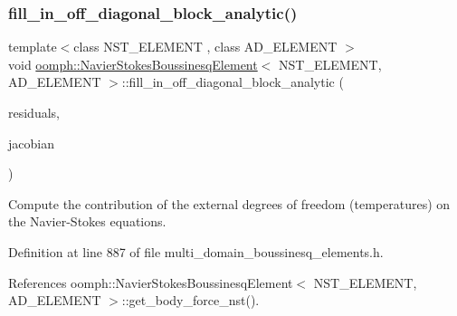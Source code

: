 \subsubsection{\texorpdfstring{fill\+\_\+in\+\_\+off\+\_\+diagonal\+\_\+block\+\_\+analytic()}{fill\_in\_off\_diagonal\_block\_analytic()}}
{\footnotesize\ttfamily template$<$class N\+S\+T\+\_\+\+E\+L\+E\+M\+E\+NT , class A\+D\+\_\+\+E\+L\+E\+M\+E\+NT $>$ \\
void \hyperlink{classoomph_1_1NavierStokesBoussinesqElement}{oomph\+::\+Navier\+Stokes\+Boussinesq\+Element}$<$ N\+S\+T\+\_\+\+E\+L\+E\+M\+E\+NT, A\+D\+\_\+\+E\+L\+E\+M\+E\+NT $>$\+::fill\+\_\+in\+\_\+off\+\_\+diagonal\+\_\+block\+\_\+analytic (\begin{DoxyParamCaption}\item[{Vector$<$ double $>$ \&}]{residuals,  }\item[{Dense\+Matrix$<$ double $>$ \&}]{jacobian }\end{DoxyParamCaption})\hspace{0.3cm}{\ttfamily [inline]}}



Compute the contribution of the external degrees of freedom (temperatures) on the Navier-\/\+Stokes equations. 



Definition at line 887 of file multi\+\_\+domain\+\_\+boussinesq\+\_\+elements.\+h.



References oomph\+::\+Navier\+Stokes\+Boussinesq\+Element$<$ N\+S\+T\+\_\+\+E\+L\+E\+M\+E\+N\+T, A\+D\+\_\+\+E\+L\+E\+M\+E\+N\+T $>$\+::get\+\_\+body\+\_\+force\+\_\+nst().

\mbox{\label{classoomph_1_1NavierStokesBoussinesqElement_a2ff5be3155df975541a25444d43c1ca8}} 
